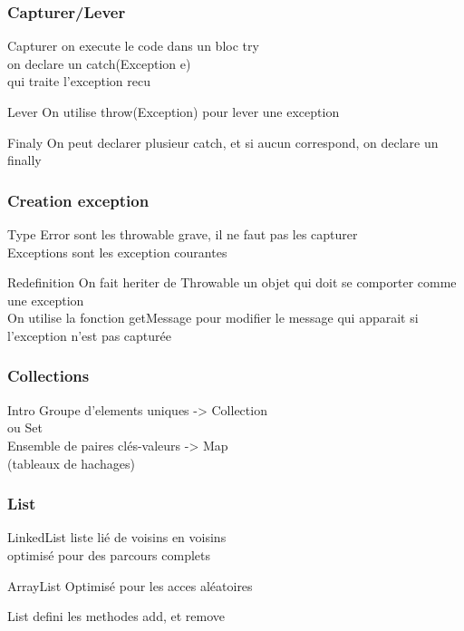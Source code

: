 \documentclass[12pt,a4paper,twoside]{beamer}
\begin{document}
\begin{frame}
\frametitle{Capturer/Lever}
\begin{block}{Capturer}
on execute le code dans un bloc try{}\\
on declare un catch(Exception e){}\\
qui traite l'exception recu\\
\end{block}
\begin{block}{Lever}
On utilise throw(Exception) pour lever une exception\\
\end{block}
\begin{block}{Finaly}
On peut declarer plusieur catch, et si aucun correspond, on declare un finally\\
\end{block}
\end{frame}
\begin{frame}
\frametitle{Creation exception}
\begin{block}{Type}
Error sont les throwable grave, il ne faut pas les capturer\\
Exceptions sont les exception courantes\\
\end{block}
\begin{block}{Redefinition}
On fait heriter de Throwable un objet qui doit se comporter comme une exception\\
On utilise la fonction getMessage pour modifier le message qui apparait si l'exception n'est pas capturée\\
\end{block}
\end{frame}
\begin{frame}
\frametitle{Collections}
\begin{block}{Intro}
Groupe d'elements uniques -> Collection\\
ou Set\\
Ensemble de paires clés-valeurs -> Map\\
(tableaux de hachages)\\
\end{block}
\end{frame}
\begin{frame}
\frametitle{List}
\begin{block}{LinkedList}
liste lié de voisins en voisins\\
optimisé pour des parcours complets\\
\end{block}
\begin{block}{ArrayList}
Optimisé pour les acces aléatoires\\
\end{block}
\begin{block}{List}
defini les methodes add, et remove\\
\end{block}
\end{frame}
\end{document}
